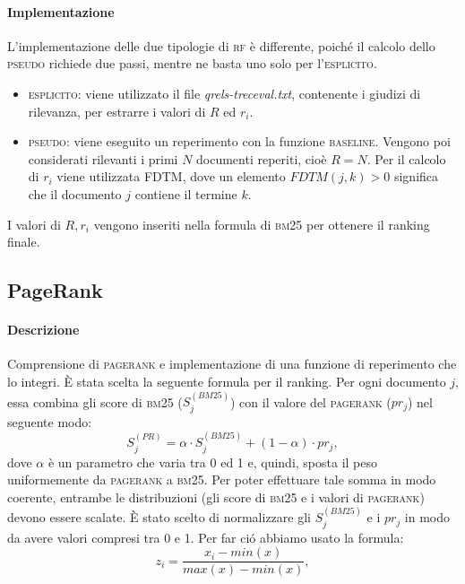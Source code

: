 \paragraph{\textbf{Implementazione}} 
L'implementazione delle due tipologie di \textsc{rf} \`e differente, poich\'e il calcolo dello \textsc{pseudo} richiede due passi, mentre ne basta uno solo per l'\textsc{esplicito}.
\begin{itemize}
\item \textsc{esplicito}: viene utilizzato il file \textit{qrels-treceval.txt}, contenente i giudizi di rilevanza, per estrarre i valori di $R$ ed $r_i$.
\item \textsc{pseudo}: viene eseguito un reperimento con la funzione \textsc{baseline}. Vengono poi considerati rilevanti i primi $N$ documenti reperiti, cio\`e $R=N$. Per il calcolo di $r_i$ viene utilizzata FDTM, dove un elemento $FDTM(j, k)>0$ significa che il documento $j$ contiene il termine $k$.
\end{itemize}
I valori di $R, r_i$ vengono inseriti nella formula di \textsc{bm25} per ottenere il ranking finale.

\subsection{PageRank}
\label{sec:pagerank}

\paragraph{\textbf{Descrizione}}
Comprensione di \textsc{pagerank} e implementazione di una funzione di reperimento che lo integri.
\`E stata scelta la seguente formula per il ranking. Per ogni documento $j$, essa combina gli score di \textsc{bm25} ($S^{(BM25)}_j$)  con il valore del \textsc{pagerank} ($pr_j$) nel seguente modo:
\[ S^{(PR)}_j =  \alpha \cdot S^{(BM25)}_j + (1-\alpha) \cdot pr_j,\]
dove $\alpha$ \`e un parametro che varia tra 0 ed 1 e, quindi, sposta il peso uniformemente da \textsc{pagerank} a \textsc{bm25}.
Per poter effettuare tale somma in modo coerente, entrambe le distribuzioni (gli score di \textsc{bm25} e i valori di \textsc{pagerank}) devono essere scalate. \`E stato scelto di normalizzare gli $S^{(BM25)}_j$ e i $pr_j$ in modo da avere valori compresi tra 0 e 1. Per far ci\'o abbiamo usato la formula:
\[ z_i = \frac{x_i - min(x)}{max(x) - min(x)}, \]

